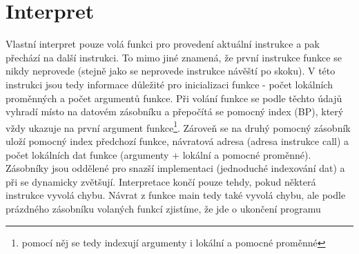 \section{Interpret}
Vlastní interpret pouze volá funkci pro provedení aktuální instrukce a pak přechází na další instrukci. To mimo jiné znamená, že první instrukce funkce se nikdy neprovede (stejně jako se neprovede instrukce návěští po skoku). V této instrukci jsou tedy informace důležité pro inicializaci funkce - počet lokálních proměnných a počet argumentů funkce. Při volání funkce se podle těchto údajů vyhradí místo na datovém zásobníku a přepočítá se pomocný index (BP), který vždy ukazuje na první argument funkce\footnote{pomocí něj se tedy indexují argumenty i lokální a pomocné proměnné}. Zároveň se na druhý pomocný zásobník uloží pomocný index předchozí funkce, návratová adresa (adresa instrukce call) a počet lokálních dat funkce (argumenty + lokální a pomocné proměnné). Zásobníky jsou oddělené pro snazší implementaci (jednoduché indexování dat) a při  se dynamicky zvětšují.
Interpretace končí pouze tehdy, pokud některá instrukce vyvolá chybu. Návrat z funkce main tedy také vyvolá chybu, ale podle prázdného zásobníku volaných funkcí zjistíme, že jde o ukončení programu
